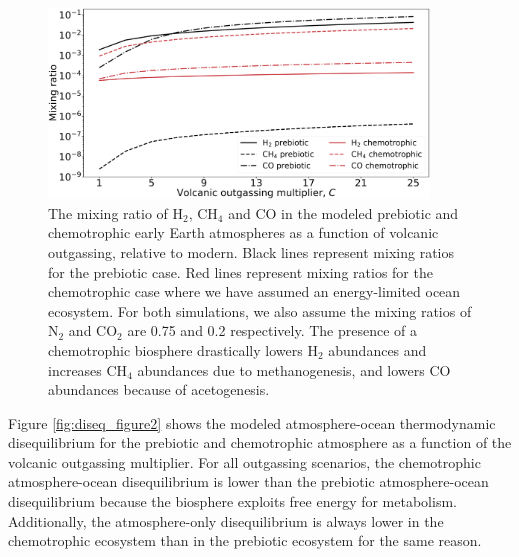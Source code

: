 \begin{figure}
  \centering
  \includegraphics[width=0.9\textwidth]{tex/2diseq/Figure1.pdf}
  \caption{The mixing ratio of H$_2$, CH$_4$ and CO in the modeled prebiotic and chemotrophic early Earth atmospheres as a function of volcanic outgassing, relative to modern. Black lines represent mixing ratios for the prebiotic case. Red lines represent mixing ratios for the chemotrophic case where we have assumed an energy-limited ocean ecosystem. For both simulations, we also assume the mixing ratios of N$_2$ and CO$_2$ are 0.75 and 0.2 respectively. The presence of a chemotrophic biosphere drastically lowers H$_2$ abundances and increases CH$_4$ abundances due to methanogenesis, and lowers CO abundances because of acetogenesis.}
  \label{fig:diseq_figure1}
\end{figure}

Figure \ref{fig:diseq_figure2} shows the modeled atmosphere-ocean thermodynamic disequilibrium for the prebiotic and chemotrophic atmosphere as a function of the volcanic outgassing multiplier. For all outgassing scenarios, the chemotrophic atmosphere-ocean disequilibrium is lower than the prebiotic atmosphere-ocean disequilibrium because the biosphere exploits free energy for metabolism. Additionally, the atmosphere-only disequilibrium is always lower in the chemotrophic ecosystem than in the prebiotic ecosystem for the same reason.

